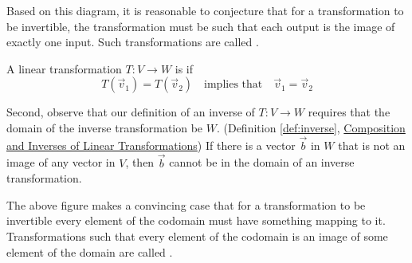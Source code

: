 \documentclass{ximera}
\begin{document}
  Based on this diagram, it is reasonable to conjecture that for a transformation to be invertible, the transformation must be such that each output is the image of exactly one input.  Such transformations are called . 

\begin{definition}\label{def:onetoone} A linear transformation $T:V\rightarrow W$ is  if 
$$T(\vec{v}_1)=T(\vec{v}_2)\quad \text{implies that}\quad \vec{v}_1=\vec{v}_2$$
\end{definition}  

Second, observe that our definition of an inverse of $T:V\rightarrow W$ requires that the domain of the inverse transformation be $W$. (Definition \ref{def:inverse}, \href{https://ximera.osu.edu/linearalgebradzv3/LinearAlgebraInteractiveIntro/LTR-0030/main}{Composition and Inverses of Linear Transformations})  If there is a vector $\vec{b}$ in $W$ that is not an image of any vector in $V$, then $\vec{b}$ cannot be in the domain of an inverse transformation. 

\begin{center}
 \end{center}

The above figure makes a convincing case that for a transformation to be invertible every element of the codomain must have something mapping to it. Transformations such that every element of the codomain is an image of some element of the domain are called .
\end{document}
